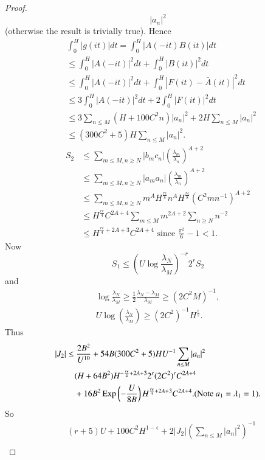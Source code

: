 \begin{proof}
$$|a_n|^2 $$ 
(otherwise the result is trivially true). Hence
\begin{align*}
& \int^H_0 |g(it)| dt = \int^H_0 |A(-it)B(it)|dt\\
& \leq \int^H_0 |A(-it)|^2 dt + \int^H_0 |B(it)|^2 dt\\
& \leq \int^H_0 |A(-it)|^2 dt + \int^H_0 |F(it) - \bar{A}(it)|^2 dt\\
& \leq 3 \int^H_0 |A(-it)|^2 dt + 2 \int^H_0|F(it)|^2 dt\\
& \leq 3 \sum\limits_{n\leq M} (H+100C^2 n) |a_n|^2 + 2 H \sum\limits_{n\leq M} |a_n|^2\\
& \leq (300 C^2 + 5) H \sum\limits_{n \leq M} |a_n|^2.
\end{align*}
\begin{align*}
S_2 & \leq \sum\limits_{m\leq M, n\geq N} |b_m c_n| \left( \frac{\lambda_m}{\lambda_n}\right)^{A+2}\\
& \leq \sum\limits_{m\leq M, n \geq N} |a_m a_n| \left(\frac{\lambda_m}{\lambda_n} \right)^{A+2} \\
& \leq \sum\limits_{m\leq M, n\geq N} m^A H^{\frac{r\epsilon}{8}} n^A H^{\frac{r\epsilon}{8}} (C^2 mn^{-1})^{A+2}\\
& \leq H^{\frac{r\epsilon}{4}} C^{2A+4} \sum\limits_{m\leq M} m^{2A+2} \sum\limits_{n\geq N} n^{-2}\\
& \leq H^{\frac{r\epsilon}{4} + 2 A + 3}  C^{2A+4} \text{ since } \frac{\pi^2}{6} - 1 < 1.
\end{align*}
Now
$$
S_1 \leq \left(U \log \frac{\lambda_N}{\lambda_M}\right)^{-r} 2^r S_2
$$
and
\begin{gather*}
\log \frac{\lambda_N}{\lambda_M} \geq \frac{1}{2} \frac{\lambda_N -\lambda_M}{\lambda_M} \geq (2C^2 M)^{-1},\\
U \log \left( \frac{\lambda_N}{\lambda_M}\right) \geq (2C^2)^{-1} H^{\frac{\epsilon}{2}}.
\end{gather*}
Thus\pageoriginale
\begin{align*}
|J_2| & \leq \frac{2B^2}{U^{10}} + 54 B (300 C^2 + 5) HU^{-1} \sum\limits_{n \leq M} |a_n|^2\\
  & \quad (H + 64 B^2) H^{-\frac{r\epsilon}{4} + 2A + 3} 2^r (2C^2)^r C^{2A+4}\\
& \quad  + 16 B^2 \operatorname{Exp} \left(-\frac{U}{8B} \right) H^{\frac{r\epsilon}{4} + 2 A + 3} C^{2A+4}. (\text{Note } a_1 =\lambda_1 =1).
\end{align*}
So
\begin{align*}
& (r+5) U +100 C^2 H^{1-\epsilon}  + 2 |J_2| \left(\sum\limits_{n\leq M} |a_n|^2 \right)^{-1}\\

\end{align*}
\end{proof}

